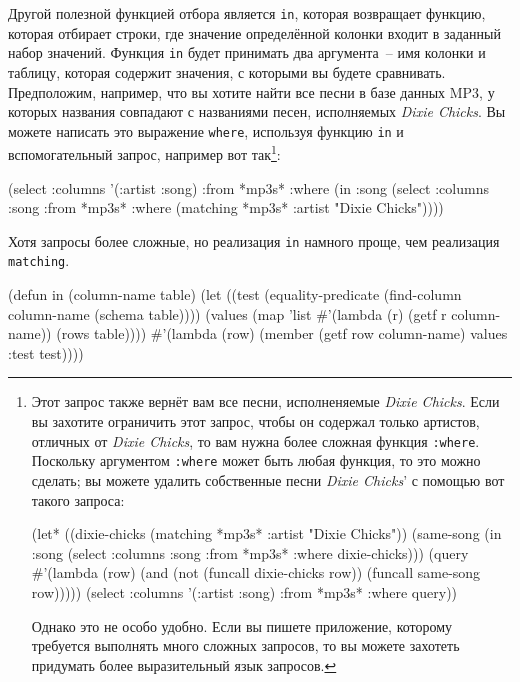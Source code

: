 Другой полезной функцией отбора является \lstinline{in}, которая возвращает функцию, которая
отбирает строки, где значение определённой колонки входит в заданный набор значений.
Функция \lstinline{in} будет принимать два аргумента~-- имя колонки и таблицу, которая
содержит значения, с которыми вы будете сравнивать.  Предположим, например, что вы хотите
найти все песни в базе данных MP3, у которых названия совпадают с названиями песен,
исполняемых \textit{Dixie Chicks}.  Вы можете написать это выражение \lstinline{where},
используя функцию \lstinline{in} и вспомогательный запрос, например вот так\footnote{Этот
  запрос также вернёт вам все песни, исполненяемые \textit{Dixie Chicks}.  Если вы захотите
  ограничить этот запрос, чтобы он содержал только артистов, отличных от \textit{Dixie
    Chicks}, то вам нужна более сложная функция \lstinline{:where}.  Поскольку аргументом
  \lstinline{:where} может быть любая функция, то это можно сделать; вы можете удалить
  собственные песни \textit{Dixie Chicks}' с помощью вот такого запроса:

\begin{myverb}
(let* ((dixie-chicks (matching *mp3s* :artist "Dixie Chicks"))
       (same-song (in :song (select :columns :song :from *mp3s* :where dixie-chicks)))
       (query #'(lambda (row) (and (not (funcall dixie-chicks row)) 
                                   (funcall same-song row)))))
  (select :columns '(:artist :song) :from *mp3s* :where query))
\end{myverb}

Однако это не особо удобно.  Если вы пишете приложение, которому требуется выполнять много
сложных запросов, то вы можете захотеть придумать более выразительный язык запросов.}:

\begin{myverb}
(select
  :columns '(:artist :song)
  :from *mp3s*
  :where (in :song 
             (select
               :columns :song
               :from *mp3s*
               :where (matching *mp3s* :artist "Dixie Chicks"))))
\end{myverb}

Хотя запросы более сложные, но реализация \lstinline{in} намного проще, чем реализация
\lstinline{matching}.

\begin{myverb}
(defun in (column-name table)
  (let ((test (equality-predicate (find-column column-name (schema table))))
        (values (map 'list #'(lambda (r) (getf r column-name)) (rows table))))
    #'(lambda (row)
        (member (getf row column-name) values :test test))))
\end{myverb}

